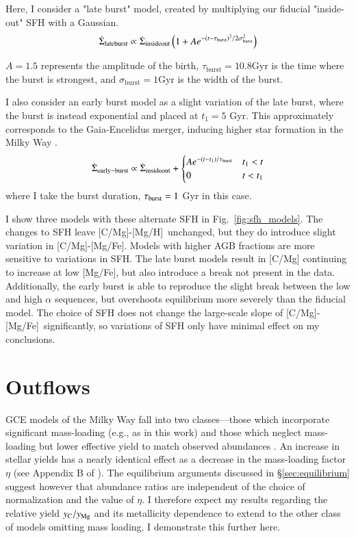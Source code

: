 \documentclass[12pt,oneside]{report}
\newcommand{\caah}{[C/Mg]-[Mg/H]}
\newcommand{\caafe}{[C/Mg]-[Mg/Fe]}
\begin{document}
Here, I consider a "late burst" model, created by multiplying our fiducial "inside-out" SFH with a Gaussian.
\begin{equation}\label{eq:lateburst}
    \dot{\Sigma}_{\rm lateburst} \propto \dot{\Sigma}_{\rm insideout} \left(1 + A e^{-(t-\tau_{\rm burst})^2/2\sigma^2_{\rm burst}} \right)
\end{equation}

$A=1.5$ represents the amplitude of the birth, $\tau_\text{burst}=10.8$Gyr is the time where the burst is strongest, and $\sigma_\text{burst}=1$Gyr is the width of the burst.

I also consider an early burst model as a slight variation of the late burst, where the burst is instead exponential and placed at $t_1=5$ Gyr. This approximately corresponds to the Gaia-Encelidus merger, inducing higher star formation in the Milky Way \citep{spitoni21, bonaca20, helmi18}.
\begin{equation}\label{eq:twoinfall}
    \dot{\Sigma}_{\rm early-burst} \propto \dot{\Sigma}_{\rm insideout} + 
\begin{cases}
    Ae^{-(t-t_1)/\tau_{\rm burst}} & t_1 < t \\
      0 & t<t_1
\end{cases}
\end{equation}
where I take the burst duration, $\tau_{\rm burst}=1$ Gyr in this case. 

I show three models with these alternate SFH in Fig.~\ref{fig:sfh_models}. The changes to SFH leave \caah\ unchanged, but they do introduce slight variation in \caafe. Models with higher AGB fractions are more sensitive to variations in SFH. The late burst models result in [C/Mg] continuing to increase at low [Mg/Fe], but also introduce a break not present in the data. Additionally, the early burst
is able to reproduce the slight break between the low and high $\alpha$ sequences, but overshoots equilibrium more severely than the fiducial model. 
The choice of SFH does not change the large-scale slope of \caafe~significantly, so variations of SFH only have minimal effect on my conclusions.

\section{Outflows} \label{sec:outflows}

GCE models of the Milky Way fall into two classes---those which incorporate significant mass-loading (e.g., as in this work) and those which neglect mass-loading but lower effective yield to match observed abundances \citep{MCM13, MCM14, spitoni19, spitoni20, spitoni21}.
An increase in stellar yields has a nearly identical effect as a decrease in the mass-loading factor $\eta$ (see Appendix B of \cite{james_dwarf}).
The equilibrium arguments discussed in \S\ref{sec:equilibrium} suggest however that abundance ratios are independent of the choice of normalization and the value of $\eta$. I therefore expect my results regarding the relative yield $y_{\rm C}/y_{\rm Mg}$ and its metallicity dependence to extend to the other class of models omitting mass loading. I demonstrate this further here.
\end{document}
